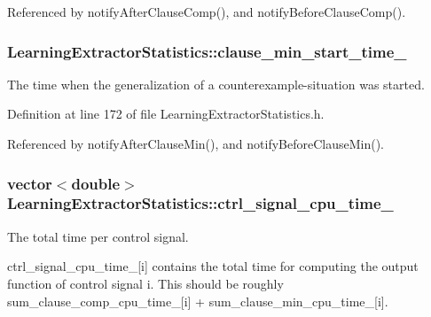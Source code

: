 Referenced by notify\-After\-Clause\-Comp(), and notify\-Before\-Clause\-Comp().

\hypertarget{classLearningExtractorStatistics_aad8e031085a746b5fc30b8185bf5dabf}{
\subsubsection[{clause\-\_\-min\-\_\-start\-\_\-time\-\_\-}]{ Learning\-Extractor\-Statistics\-::clause\-\_\-min\-\_\-start\-\_\-time\-\_\-\hspace{0.3cm}{\ttfamily [protected]}}}\label{classLearningExtractorStatistics_aad8e031085a746b5fc30b8185bf5dabf}


The time when the generalization of a counterexample-\/situation was started. 



Definition at line 172 of file Learning\-Extractor\-Statistics.\-h.



Referenced by notify\-After\-Clause\-Min(), and notify\-Before\-Clause\-Min().

\hypertarget{classLearningExtractorStatistics_a836a3f1d0bdf023577056a8b05f769ca}{
\subsubsection[{ctrl\-\_\-signal\-\_\-cpu\-\_\-time\-\_\-}]{\setlength{\rightskip}{0pt plus 5cm}vector$<$double$>$ Learning\-Extractor\-Statistics\-::ctrl\-\_\-signal\-\_\-cpu\-\_\-time\-\_\-\hspace{0.3cm}{\ttfamily [protected]}}}\label{classLearningExtractorStatistics_a836a3f1d0bdf023577056a8b05f769ca}


The total time per control signal. 

ctrl\-\_\-signal\-\_\-cpu\-\_\-time\-\_\-\mbox{[}i\mbox{]} contains the total time for computing the output function of control signal i. This should be roughly sum\-\_\-clause\-\_\-comp\-\_\-cpu\-\_\-time\-\_\-\mbox{[}i\mbox{]} + sum\-\_\-clause\-\_\-min\-\_\-cpu\-\_\-time\-\_\-\mbox{[}i\mbox{]}. 

